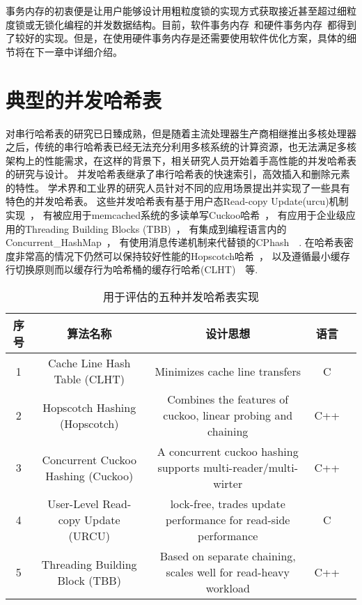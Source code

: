 事务内存的初衷便是让用户能够设计用粗粒度锁的实现方式获取接近甚至超过细粒度锁或无锁化编程的并发数据结构。目前，软件事务内存~\cite{todo}和硬件事务内存~\cite{todo}都得到了较好的实现。但是，在使用硬件事务内存是还需要使用软件优化方案，具体的细节将在下一章中详细介绍。


\section{典型的并发哈希表}

对串行哈希表的研究已日臻成熟，但是随着主流处理器生产商相继推出多核处理器之后，传统的串行哈希表已经无法充分利用多核系统的计算资源，也无法满足多核架构上的性能需求，在这样的背景下，相关研究人员开始着手高性能的并发哈希表的研究与设计。
并发哈希表继承了串行哈希表的快速索引，高效插入和删除元素的特性。
学术界和工业界的研究人员针对不同的应用场景提出并实现了一些具有特色的并发哈希表。
这些并发哈希表有基于用户态Read-copy Update(urcu)机制实现~\cite{urcu}，
有被应用于memcached系统的多读单写Cuckoo哈希~\cite{memc3}，
有应用于企业级应用的Threading Building Blocks (TBB)~\cite{tbb}，
有集成到编程语言内的Concurrent\_HashMap~\cite{oracle}，
有使用消息传递机制来代替锁的CPhash~\cite{metreveli2012cphash}~.
在哈希表密度非常高的情况下仍然可以保持较好性能的Hopscotch哈希~\cite{hopscotch}，
以及遵循最小缓存行切换原则而以缓存行为哈希桶的缓存行哈希(CLHT)~\cite{clht}~等.

\begin{table}[htbp]
  \caption{用于评估的五种并发哈希表实现}
\label{tab:concurrent_hash}
\footnotesize
\centering
\begin{tabular}{ccccc}
\toprule
序号 &   算法名称   &   设计思想     &   语言\\
\midrule
1  &  Cache Line Hash Table (CLHT)   &  Minimizes cache line transfers \cite{clht} &   C\\

2  &  Hopscotch Hashing (Hopscotch)   &  Combines the features of cuckoo, linear probing and chaining \cite{hopscotch}     &   C++ \\

3  &   Concurrent Cuckoo Hashing (Cuckoo)   &  A concurrent cuckoo hashing supports multi-reader/multi-wirter \cite{cuckoo}  &   C++ \\

4  &   User-Level Read-copy Update (URCU)   &   lock-free, trades update performance for read-side performance \cite{urcu}   &   C \\

5  &   Threading Building Block (TBB)   &   Based on separate chaining, scales well for read-heavy workload \cite{tbb}        &   C++ \\
\bottomrule
\end{tabular}
\end{table}

